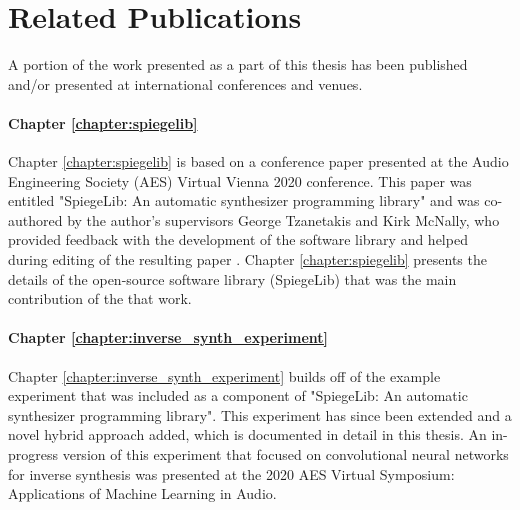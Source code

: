 \newpage
{}

\chapter*{Related Publications}

A portion of the work presented as a part of this thesis has been published and/or presented at international conferences and venues. 

\subsubsection{Chapter \ref{chapter:spiegelib}}
Chapter \ref{chapter:spiegelib} is based on a conference paper presented at the Audio Engineering Society (AES) Virtual Vienna 2020 conference. This paper was entitled "SpiegeLib: An automatic synthesizer programming library" and was co-authored by the author's supervisors George Tzanetakis and Kirk McNally, who provided feedback with the development of the software library and helped during editing of the resulting paper \cite{shier2020spiegelib}. Chapter \ref{chapter:spiegelib} presents the details of the open-source software library (SpiegeLib) that was the main contribution of the that work. 

\subsubsection{Chapter \ref{chapter:inverse_synth_experiment}}
Chapter \ref{chapter:inverse_synth_experiment} builds off of the example experiment that was included as a component of "SpiegeLib: An automatic synthesizer programming library". This experiment has since been extended and a novel hybrid approach added, which is documented in detail in this thesis. An in-progress version of this experiment that focused on convolutional neural networks for inverse synthesis was presented at the 2020 AES Virtual Symposium: Applications of Machine Learning in Audio. 

